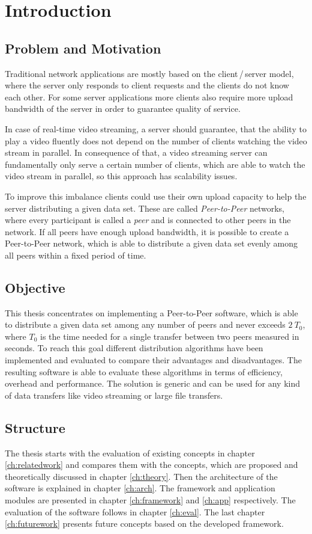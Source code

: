 \chapter{Introduction}
\section{Problem and Motivation}
Traditional network applications are mostly based on the client\,/\,server model, where the server only responds to client requests and the clients do not know each other. 
For some server applications more clients also require more upload bandwidth of the server in order to guarantee quality of service.

In case of real-time video streaming, a server should guarantee, that the ability to play a video fluently does not depend on the number of clients watching the video stream in parallel. In consequence of that, a video streaming server can fundamentally only serve a certain number of clients, which are able to watch the video stream in parallel, so this approach has scalability issues.

To improve this imbalance clients could use their own upload capacity to help the server distributing a given data set. These are called \emph{Peer-to-Peer} networks, where every participant is called a \emph{peer} and is connected to other peers in the network.  If all peers have enough upload bandwidth, it is possible to create a Peer-to-Peer network, which is able to distribute a given data set evenly among all peers within a fixed period of time.

\section{Objective}
This thesis concentrates on implementing a Peer-to-Peer software, which is able to distribute a given data set among any number of peers and never exceeds $2\:T_0$, where $T_0$ is the time needed for a single transfer between two peers measured in seconds. To reach this goal different distribution algorithms have been implemented and evaluated to compare their advantages and disadvantages. The resulting software is able to evaluate these algorithms in terms of efficiency, overhead and performance. The solution is generic and can be used for any kind of data transfers like video streaming or large file transfers.

\section{Structure}
The thesis starts with the evaluation of existing concepts in chapter \ref{ch:relatedwork} and compares them with the concepts, which are proposed and theoretically discussed in chapter \ref{ch:theory}. Then the architecture of the software is explained in chapter \ref{ch:arch}. The framework and application modules are presented in chapter \ref{ch:framework} and \ref{ch:app} respectively. The evaluation of the software follows in chapter \ref{ch:eval}. The last chapter \ref{ch:futurework} presents future concepts based on the developed framework.